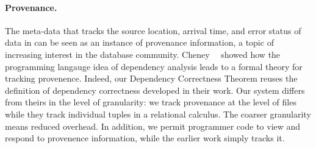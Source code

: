 



\paragraph*{Provenance.}  The meta-data that tracks the source location,
arrival time, and error status of data in \padsd{} can be seen as an
instance of provenance information, a topic of increasing interest
in the database community.  Cheney~\etal{}~\cite{cheney-dbpl07} showed
how the programming langauge idea of dependency analysis leads to a
formal theory for tracking provenence.  Indeed, our Dependency Correctness
Theorem reuses the definition of dependency correctness developed in
their work.  Our system differs from theirs in the level of
granularity: we track provenance at the level of files while they
track individual tuples in a relational calculus.  The coarser
granularity means reduced overhead.  In addition, we permit programmer
code to view and respond to provenence information, while the earlier
work simply tracks it. 


